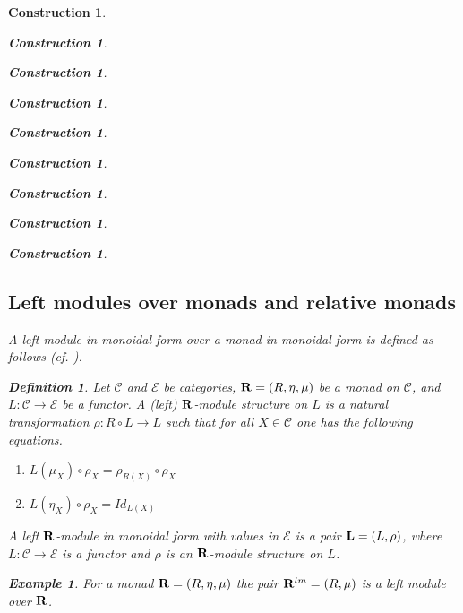 \documentclass[onecolumn,12pt]{amsart}
\newtheorem{definition}[proposition]{Definition}
\newtheorem{example}[proposition]{Example}
\numberwithin{proposition}{subsection}
\newtheorem{construction}[proposition]{Construction}
\newcommand{\sr}{\rightarrow}
\newcommand{\R}{{\bf R}}
\newcommand{\C}{{\mathcal C}}
\newcommand{\E}{{\mathcal E}}
\begin{document}
\begin{construction}
\begin{construction}
\begin{construction}
\begin{construction}
\begin{construction}
\begin{construction}
\begin{construction}
\begin{construction}
\begin{construction}
\subsection{Left modules over monads and relative monads}

%
A left module in monoidal form over a monad in monoidal form is defined as follows (cf.{} \cite[p.~222]{HM2007}). 
%
\begin{definition}
\label{2017.04.01.def2} 
Let $\C$ and $\E$ be categories, $\R=(R,\eta,\mu)$ be a
monad on $\C$, and $L:\C\sr \E$ be a functor. A {\em (left) $\R$-module structure} on
$L$ is a natural transformation $\rho:R\circ L\sr L$ such that for all $X\in\C$
one has the following equations.
%
\begin{enumerate}
\item $L(\mu_X)\circ \rho_X=\rho_{R(X)}\circ \rho_X$
\item $L(\eta_X)\circ \rho_X=Id_{L(X)}$
\end{enumerate}
%
A left $\R$-module in monoidal form with values in $\E$ is a pair 
${\bf L}=(L,\rho)$, where $L:\C\sr \E$ is a functor and $\rho$ is an $\R$-module
structure on $L$.
\end{definition}
%
\begin{example}\label{2017.04.15.ex1}\rm
For a monad $\R=(R,\eta,\mu)$ the pair $\R^{lm}=(R,\mu)$ is a left module over $\R$.
\end{example}
%


\end{construction}
\end{construction}
\end{construction}
\end{construction}
\end{construction}
\end{construction}
\end{construction}
\end{construction}
\end{construction}
\end{document}
